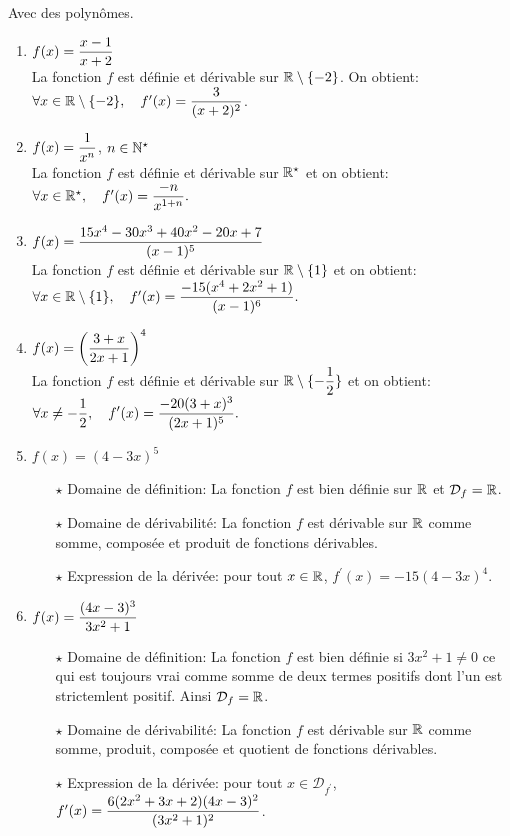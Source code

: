 \documentclass[a4paper, 11pt,reqno]{article}
\begin{document}
\begin{correction}  \; Avec des polyn\^omes.\\
	\begin{enumerate}
		\item $f(x)=\displaystyle\frac{x-1}{x+2}$\\
		      \noindent  La fonction $f$ est d\'efinie et d\'erivable sur $\mathbb{R}\setminus\lbrace -2\rbrace$. On obtient:
		      $\forall x\in\mathbb{R}\setminus\lbrace -2\rbrace,\quad f^{\prime}(x)=\displaystyle\frac{3}{(x+2)^2}$.
		\item $f(x)=\displaystyle\frac{1}{x^n}$, $n\in\mathbb{N}^{\star}$\\
		      \noindent  La fonction $f$ est d\'efinie et d\'erivable sur $\mathbb{R}^{\star}$ et on obtient:
		      $\forall x\in\mathbb{R}^{\star},\quad f^{\prime}(x)=\displaystyle\frac{-n}{x^{1+n}}.$
		\item $f(x)=\displaystyle\frac{15x^4-30x^3+40x^2-20x+7}{(x-1)^5}$ \\
		      \noindent  La fonction $f$ est d\'efinie et d\'erivable sur $\mathbb{R}\setminus\lbrace 1\rbrace$ et on obtient:
		      $\forall x\in\mathbb{R}\setminus\lbrace 1\rbrace,\quad f^{\prime}(x)=\displaystyle\frac{-15(x^4+2x^2+1)}{(x-1)^6}.$
		\item $f(x)=\left( \displaystyle\frac{3+x}{2x+1} \right)^4$\\
		      \noindent  La fonction $f$ est d\'efinie et d\'erivable sur $\mathbb{R}\setminus\lbrace -\displaystyle\frac{1}{2}\rbrace$ et on obtient:
		      $\forall x\not= -\displaystyle\frac{1}{2},\quad f^{\prime}(x)=\displaystyle\frac{-20(3+x)^3}{(2x+1)^5}.$
		\item $f(x)=(4-3x)^5$
		      \begin{itemize}
			      \item[$\star$] Domaine de d\'efinition: La fonction $f$ est bien d\'efinie sur $\mathbb{R}$ et $\mathcal{D}_f=\mathbb{R}$.
			      \item[$\star$] Domaine de d\'erivabilit\'e: La fonction $f$ est d\'erivable sur $\mathbb{R}$ comme somme, compos\'ee et produit de fonctions d\'erivables.
			      \item[$\star$] Expression de la d\'eriv\'ee: pour tout $x\in\mathbb{R}$, $f^{\prime}(x)=-15(4-3x)^4$.
		      \end{itemize}
		\item $f(x)=\displaystyle\frac{(4x-3)^3}{3x^2+1}$
		      \begin{itemize}
			      \item[$\star$] Domaine de d\'efinition: La fonction $f$ est bien d\'efinie si $3x^2+1\not= 0$ ce qui est toujours vrai comme somme de deux termes positifs dont l'un est strictemlent positif. Ainsi $\mathcal{D}_f=\mathbb{R}$.
			      \item[$\star$] Domaine de d\'erivabilit\'e: La fonction $f$ est d\'erivable sur $\mathbb{R}$ comme somme, produit, compos\'ee et quotient de fonctions d\'erivables.
			      \item[$\star$] Expression de la d\'eriv\'ee: pour tout $x\in\mathcal{D}_{f^{\prime}}$, $f^{\prime}(x)=\displaystyle\frac{6(2x^2+3x+2)(4x-3)^2}{(3x^2+1)^2}$.
		      \end{itemize}
	\end{enumerate}
\end{correction}
\end{document}
